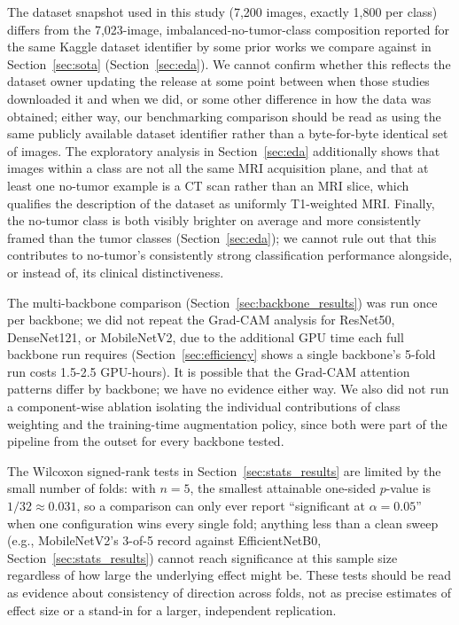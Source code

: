 \documentclass[11pt]{article}
\begin{document}
The dataset snapshot used in this study (7,200 images, exactly 1,800 per class) differs from the 7,023-image, imbalanced-no-tumor-class composition reported for the same Kaggle dataset identifier by some prior works we compare against in Section~\ref{sec:sota} (Section~\ref{sec:eda}). We cannot confirm whether this reflects the dataset owner updating the release at some point between when those studies downloaded it and when we did, or some other difference in how the data was obtained; either way, our benchmarking comparison should be read as using the same publicly available dataset identifier rather than a byte-for-byte identical set of images. The exploratory analysis in Section~\ref{sec:eda} additionally shows that images within a class are not all the same MRI acquisition plane, and that at least one no-tumor example is a CT scan rather than an MRI slice, which qualifies the description of the dataset as uniformly T1-weighted MRI. Finally, the no-tumor class is both visibly brighter on average and more consistently framed than the tumor classes (Section~\ref{sec:eda}); we cannot rule out that this contributes to no-tumor's consistently strong classification performance alongside, or instead of, its clinical distinctiveness.

The multi-backbone comparison (Section~\ref{sec:backbone_results}) was run once per backbone; we did not repeat the Grad-CAM analysis for ResNet50, DenseNet121, or MobileNetV2, due to the additional GPU time each full backbone run requires (Section~\ref{sec:efficiency} shows a single backbone's 5-fold run costs 1.5-2.5 GPU-hours). It is possible that the Grad-CAM attention patterns differ by backbone; we have no evidence either way. We also did not run a component-wise ablation isolating the individual contributions of class weighting and the training-time augmentation policy, since both were part of the pipeline from the outset for every backbone tested.

The Wilcoxon signed-rank tests in Section~\ref{sec:stats_results} are limited by the small number of folds: with $n=5$, the smallest attainable one-sided $p$-value is $1/32 \approx 0.031$, so a comparison can only ever report ``significant at $\alpha=0.05$'' when one configuration wins every single fold; anything less than a clean sweep (e.g., MobileNetV2's 3-of-5 record against EfficientNetB0, Section~\ref{sec:stats_results}) cannot reach significance at this sample size regardless of how large the underlying effect might be. These tests should be read as evidence about consistency of direction across folds, not as precise estimates of effect size or a stand-in for a larger, independent replication.
\end{document}
